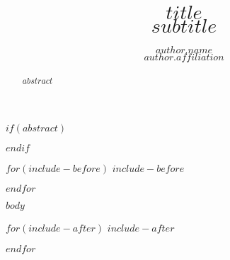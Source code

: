 \documentclass[11pt,letterpaper,final]{article}
\title{%
  $title$ \\
  \large $subtitle$}
\author{
    $author.name$ \\
    $author.affiliation$
  }
\begin{document}
\maketitle

$if(abstract)$
\begin{abstract}
$abstract$
\end{abstract}
\vspace{\fill}
$endif$

$for(include-before)$
$include-before$

$endfor$

\begin{multicols}{2}

$body$

\end{multicols}


\begin{multicols}{1}


%

\end{multicols}

$for(include-after)$
$include-after$

$endfor$
\end{document}

